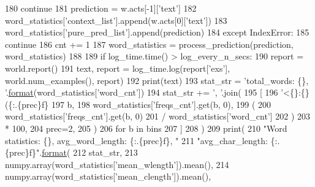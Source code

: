 \begin{DoxyCode}
180                         \textcolor{keywordflow}{continue}
181                     prediction = w.acts[-1][\textcolor{stringliteral}{'text'}]
182                     word\_statistics[\textcolor{stringliteral}{'context\_list'}].append(w.acts[0][\textcolor{stringliteral}{'text'}])
183                     word\_statistics[\textcolor{stringliteral}{'pure\_pred\_list'}].append(prediction)
184                 \textcolor{keywordflow}{except} IndexError:
185                     \textcolor{keywordflow}{continue}
186                 cnt += 1
187                 word\_statistics = process\_prediction(prediction, word\_statistics)
188 
189         \textcolor{keywordflow}{if} log\_time.time() > log\_every\_n\_secs:
190             report = world.report()
191             text, report = log\_time.log(report[\textcolor{stringliteral}{'exs'}], world.num\_examples(), report)
192             print(text)
193             stat\_str = \textcolor{stringliteral}{'total\_words: \{\}, '}.\hyperlink{namespaceparlai_1_1chat__service_1_1services_1_1messenger_1_1shared__utils_a32e2e2022b824fbaf80c747160b52a76}{format}(word\_statistics[\textcolor{stringliteral}{'word\_cnt'}])
194             stat\_str += \textcolor{stringliteral}{', '}.join(
195                 [
196                     \textcolor{stringliteral}{'<\{\}:\{\} (\{:.\{prec\}f\}%
197                         b,
198                         word\_statistics[\textcolor{stringliteral}{'freqs\_cnt'}].get(b, 0),
199                         (
200                             word\_statistics[\textcolor{stringliteral}{'freqs\_cnt'}].get(b, 0)
201                             / word\_statistics[\textcolor{stringliteral}{'word\_cnt'}]
202                         )
203                         * 100,
204                         prec=2,
205                     )
206                     \textcolor{keywordflow}{for} b \textcolor{keywordflow}{in} bins
207                 ]
208             )
209             print(
210                 \textcolor{stringliteral}{"Word statistics: \{\}, avg\_word\_length: \{:.\{prec\}f\}, "}
211                 \textcolor{stringliteral}{"avg\_char\_length: \{:.\{prec\}f\}"}.\hyperlink{namespaceparlai_1_1chat__service_1_1services_1_1messenger_1_1shared__utils_a32e2e2022b824fbaf80c747160b52a76}{format}(
212                     stat\_str,
213                     numpy.array(word\_statistics[\textcolor{stringliteral}{'mean\_wlength'}]).mean(),
214                     numpy.array(word\_statistics[\textcolor{stringliteral}{'mean\_clength'}]).mean(),
}
\end{DoxyCode}
